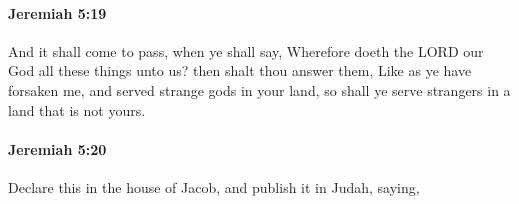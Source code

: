 		\paragraph{Jeremiah 5:19} %
			\label{JEREMIAH-5-19}

			And it shall come to pass, when ye shall say, Wherefore doeth the LORD our God all these things unto us? then shalt thou answer them, Like as ye have forsaken me, and served strange gods in your land, so shall ye serve strangers in a land that is not yours.


		\paragraph{Jeremiah 5:20} %
			\label{JEREMIAH-5-20}

			Declare this in the house of Jacob, and publish it in Judah, saying,


